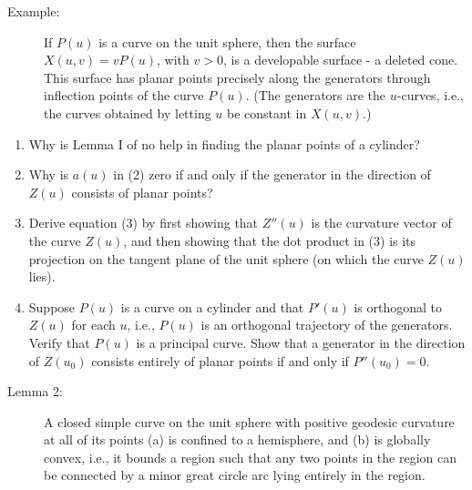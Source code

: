 \documentclass{book}
\begin{document}
\begin{description}
\item[Example:] If $P(u)$ is a curve on the unit sphere, then the surface $X(u,v) = vP(u)$, with $v > 0$, is a developable surface - a deleted cone. This surface has planar points precisely along the generators through inflection points of the curve $P(u)$. (The generators are the $u$-curves, i.e., the curves obtained by letting $u$ be constant in $X(u,v)$.)
\end{description}

\begin{enumerate}
  \item[10.] Why is Lemma I of no help in finding the planar points of a cylinder?
  \item[11.] Why is $a(u)$ in (2) zero if and only if the generator in the direction of $Z(u)$ consists of planar points?
  \item[12.] Derive equation (3) by first showing that $Z''(u)$ is the curvature vector of the curve $Z(u)$, and then showing that the dot product in (3) is its projection on the tangent plane of the unit sphere (on which the curve $Z(u)$ lies).
  \item[13.] Suppose $P(u)$ is a curve on a cylinder and that $P'(u)$ is orthogonal to $Z(u)$ for each $u$, i.e., $P(u)$ is an orthogonal trajectory of the generators. Verify that $P(u)$ is a principal curve. Show that a generator in the direction of $Z(u_{0})$ consists entirely of planar points if and only if $P''(u_{0}) = 0$.
\end{enumerate}

\begin{description}
\item[Lemma 2:] A closed simple curve on the unit sphere with positive geodesic curvature at all of its points (a) is confined to a hemisphere, and (b) is globally convex, i.e., it bounds a region such that any two points in the region can be connected by a minor great circle arc lying entirely in the region.
\end{description}
\end{document}
